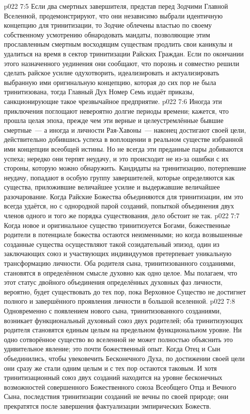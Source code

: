 \vs p022 7:5 Если два смертных завершителя, представ перед Зодчими Главной Вселенной, продемонстрируют, что они независимо выбрали идентичную концепцию для тринитизации, то Зодчие облечены властью по своему собственному усмотрению обнародовать мандаты, позволяющие этим прославленным смертным восходящим существам продлить свои каникулы и удалиться на время в сектор тринитизации Райских Граждан. Если по окончании этого назначенного уединения они сообщают, что порознь и совместно решили сделать райское усилие одухотворить, идеализировать и актуализировать выбранную ими оригинальную концепцию, которая до сих пор не была тринитизована, тогда Главный Дух Номер Семь издаёт приказы, санкционирующие такое чрезвычайное предприятие.
\vs p022 7:6 Иногда эти приключения поглощают невероятно долгие периоды времени; кажется, что прошла целая эпоха, прежде чем эти верные и целеустремлённые бывшие смертные~--- а иногда и личности Рая\hyp{}Хавоны~--- наконец достигают своей цели, действительно добившись успеха в воплощении в реальном существе избранной ими концепции всеобщей истины. Но не всегда эти преданные пары добиваются успеха; нередко они терпят неудачу, и это происходит не из\hyp{}за ошибки с их стороны, которую можно обнаружить. Кандидаты на тринитизацию, потерпевшие неудачу, попадают в особую группу завершителей, которые определяются как существа, приложившие величайшее усилие и выдержавшие величайшее разочарование. Когда Райские Божества объединяются для тринитизации, им это всегда удаётся, но с однородной парой созданий, попыткой объединения двух членов одного и того же порядка существования, дело обстоит не так.
\vs p022 7:7 \pc Когда новое и оригинальное существо тринитизуется Богами, божественные родители в потенциале божества остаются неизменными; но когда возвышенные созданные существа осуществляют такой созидательный эпизод, один из заключающих союз и участвующих индивидуумов претерпевает уникальную трансформацию личности. Оба родителя сына, тринитизованного созданиями, становятся в определённом смысле духовно как одно целое. Мы полагаем, что этот статус двойного объединения определённых духовных фаз личности, вероятно, будет существовать до тех пор, пока Верховное Существо не достигнет полного и завершённого проявления личности в большой вселенной.
\vs p022 7:8 Одновременно с появлением нового сына, тринитизованного созданиями, возникает функциональный духовный союз двух родителей; оба тринитизующих родителя становятся единым целым на предельном функциональном уровне. Ни одно сотворённое существо во вселенной не может полностью объяснить это удивительное явление; это почти божественный опыт. Когда Отец и Сын объединились, чтобы увековечить Бесконечного Духа, по достижении своей цели они сразу же стали одним целым и с тех пор остаются таковым. И хотя тринитизационный союз двух созданий находится на уровне бесконечных возможностей совершенного Божественного союза Всеобщего Отца и Вечного Сына, последствия тринитизации созданий не вечны по своей природе; они прекратятся после завершения фактуализации эмпирических Божеств.
